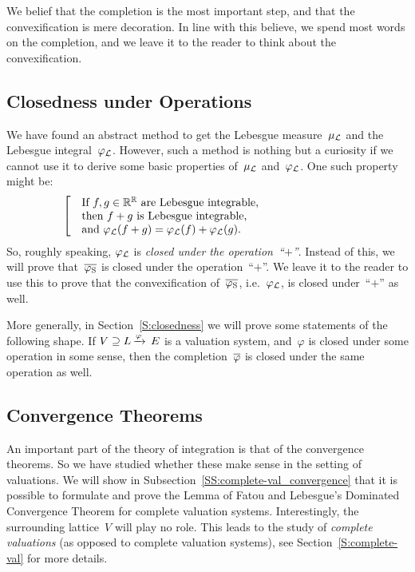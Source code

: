 \documentclass[main.tex]{subfiles}
\begin{document}
We belief that
the completion is the most important step,
and that the convexification
is mere decoration.
In line with this believe,
we spend most words
on the completion,
and we leave it to the reader
to think about the convexification.


\subsection{Closedness under Operations}
We have found an abstract method
to get the Lebesgue measure~$\mu_{\mathcal{L}}$ and
the Lebesgue integral~$\varphi_{\mathcal{L}}$.
However, such a method is nothing but a curiosity
if we cannot use it to derive some
basic properties of~$\mu_{\mathcal{L}}$ and~$\varphi_{\mathcal{L}}$.
One such property might be:
\begin{equation*}
\left[\quad
\begin{minipage}{.7\columnwidth}
If $f,g\in \R^\R$
are Lebesgue integrable,\\
then $f+g$ is Lebesgue integrable,\\
and $\Lphi(f+g) = \Lphi(f)+\Lphi(g)$.
\end{minipage}
\right.
\end{equation*}
So, roughly speaking,
$\varphi_{\mathcal{L}}$ is \emph{closed under the operation~``$+$''}.
Instead of this,
we will prove that~$\overline{\varphi_{\mathrm{S}}}$ is closed under the operation~``$+$''.
We leave it to the reader to use this to prove that the convexification
 of~$\overline{\varphi_{\mathrm{S}}}$, i.e.~$\varphi_{\mathcal{L}}$, is closed under~``$+$'' as well.

More generally,
in Section~\ref{S:closedness}
we will prove some  statements of the following shape.
If $V \supseteq L\,\smash{\xrightarrow{\varphi}\,E}$
is a valuation system,
and~$\varphi$ is closed under some operation in some sense,
then the completion~$\overline{\varphi}$ is closed under the same operation as well.


\subsection{Convergence Theorems}
An important part of the theory of integration
is that of the convergence theorems.
So we have studied whether
these make sense in the setting of valuations.
We will show in Subsection~\ref{SS:complete-val_convergence}
that it is possible to formulate
and prove
the Lemma of Fatou
and Lebesgue's Dominated Convergence Theorem
for complete valuation systems.
Interestingly,
the surrounding lattice~$V$ will play no role.
This leads to the study 
of \emph{complete valuations}
(as opposed to complete valuation systems),
see Section~\ref{S:complete-val} for more details.
\end{document}
